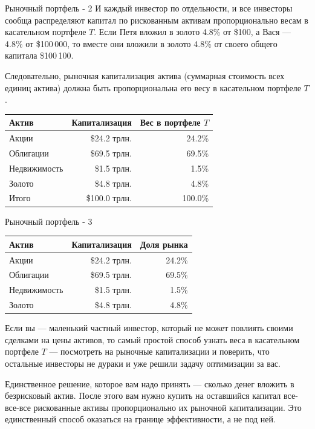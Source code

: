 \documentclass{beamer}
\begin{document}
\begin{frame}{Рыночный портфель - 2}
\justify
И каждый инвестор по отдельности, и все инвесторы сообща распределяют капитал 
по рискованным активам пропорционально весам в касательном портфеле $T$. Если 
Петя вложил в золото 4.8\% от \$100, а Вася --- 4.8\% от \$100\,000, то вместе 
они вложили в золото 4.8\% от своего общего капитала \$100\,100.

\justify
Следовательно, рыночная капитализация актива (суммарная стоимость всех единиц 
актива) должна быть пропорциональна его весу в касательном портфеле $T$.

\justify
\centering
\begin{tabular}{l|r|r}
Актив        & Капитализация & Вес в портфеле $T$ \\ \hline
Акции        &  \$24.2 трлн. &  24.2\%             \\
Облигации    &  \$69.5 трлн. &  69.5\%             \\
Недвижимость &   \$1.5 трлн. &   1.5\%             \\
Золото       &   \$4.8 трлн. &   4.8\%             \\ \hline
Итого        & \$100.0 трлн. & 100.0\% 
\end{tabular}
\end{frame}



\begin{frame}{Рыночный портфель - 3}
\centering
\begin{tabular}{l|r|r}
Актив        & Капитализация & Доля рынка \\ \hline
Акции        &  \$24.2 трлн. &  24.2\%    \\
Облигации    &  \$69.5 трлн. &  69.5\%    \\
Недвижимость &   \$1.5 трлн. &   1.5\%    \\
Золото       &   \$4.8 трлн. &   4.8\%    
\end{tabular}

\justify
Если вы --- маленький частный инвестор, который не может повлиять своими 
сделками на цены активов, то самый простой способ узнать веса в касательном 
портфеле $T$ --- посмотреть на рыночные капитализации и поверить, что остальные 
инвесторы не дураки и уже решили задачу оптимизации за вас.

\justify
Единственное решение, которое вам надо принять --- сколько денег вложить в 
безрисковый актив. После этого вам нужно купить на оставшийся капитал
все-все-все рискованные активы пропорционально их рыночной капитализации. Это 
единственный способ оказаться на границе эффективности, а не под ней.
\end{frame}
\end{document}
